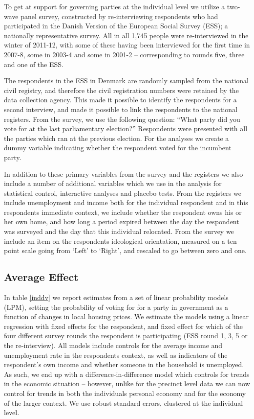 \documentclass[12pt,a4paper]{article}
\begin{document}
To get at support for governing parties at the individual level we utilize a two-wave panel survey, constructed by re-interviewing respondents who had participated in the Danish Version of the European Social Survey (ESS);  a nationally representative survey. All in all 1,745 people were re-interviewed in the winter of 2011-12, with some of these having been interviewed for the first time in 2007-8, some in 2003-4 and some in 2001-2 -- corresponding to rounds five, three and one of the ESS. 

The respondents in the ESS in Denmark are randomly sampled from the national civil registry, and therefore the civil registration numbers were retained by the data collection agency. This made it possible to identify the respondents for a second interview, and made it possible to link the respondents to the national registers. From the survey, we use the following question: ``What party did you vote for at the last parliamentary election?'' Respondents were presented with all the parties which ran at the previous election. For the analyses we create a dummy variable indicating whether the respondent voted for the incumbent party. 

In addition to these primary variables from the survey and the registers we also include a number of additional variables which we use in the analysis for statistical control, interactive analyses and placebo tests. From the registers we include unemployment and income both for the individual respondent and in this respondents immediate context, we include whether the respondent owns his or her own home, and how long a period expired between the day the respondent was surveyed and the day that this individual relocated. From the survey we include an item on the respondents ideological orientation, measured on a ten point scale going from `Left' to `Right', and rescaled to go between zero and one.

\subsection{Average Effect}
In table \ref{inddv}  we report estimates from a set of linear probability models (LPM), setting the probability of voting for for a party in government as a function of changes in local housing prices. We estimate the models using a linear regression with fixed effects for the respondent, and fixed effect for which of the four different survey rounds the respondent is participating  (ESS round 1, 3, 5 or the re-interview). All models include controls for the average income and unemployment rate in the respondents context, as well as indicators of the respondent's own income and whether someone in the household is unemployed. As such, we end up with a difference-in-difference model which controls for trends in the economic situation -- however, unlike for the precinct level data we can now control for trends in both the individuals personal economy and for the economy of the larger context. We use robust standard errors, clustered at the individual level.
\end{document}
